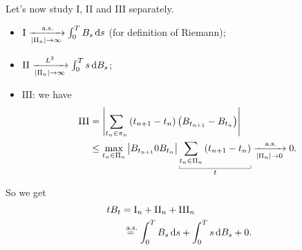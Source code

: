 \documentclass[12pt]{report}
\begin{document}
Let's now study I, II and III separately.
\begin{itemize}
	\item $\mathrm{I}\xrightarrow[|\Pi_{n}|\to\infty]{\text{ a.s.}{}}\int_{0}^{T}B_{s}\mathop{}\!\mathrm{d} s$ (for definition of Riemann);
	\item $\mathrm{II}\xrightarrow[|\Pi_{n}|\to\infty]{L^{2}}\int_{0}^{T}s\mathop{}\!\mathrm{d} B_{s}$;
	\item $\mathrm{III}$: we have 
	\begin{align*}
		\mathrm{III}&=\left|\sum_{t_{n}\in \pi_{n}}\left(t_{n+1}-t_{n}\right)\left(B_{t_{n+1}}-B_{t_{n}}\right)\right|\\
		&\leq\max_{t_{n}\in\Pi_{n}}\left|B_{t_{n+1}}0B_{t_{n}}\right|\ubracketthin{\sum_{t_{n}\in\Pi_{n}}\left(t_{n+1}-t_{n}\right)}_{t}\xrightarrow[|\Pi_{n}|\to0]{\as{}}0.
	\end{align*}
\end{itemize}
So we get
\begin{align*}
	tB_{t}&=\mathrm{I}_{n}+\mathrm{II}_{n}+\mathrm{III}_{n}\\
	&\stackrel{\text{ a.s.}{}}{=}\int_{0}^{T}B_{s}\mathop{}\!\mathrm{d} s+\int_{0}^{T}s\mathop{}\!\mathrm{d} B_{s}+0.
\end{align*}
\end{document}
